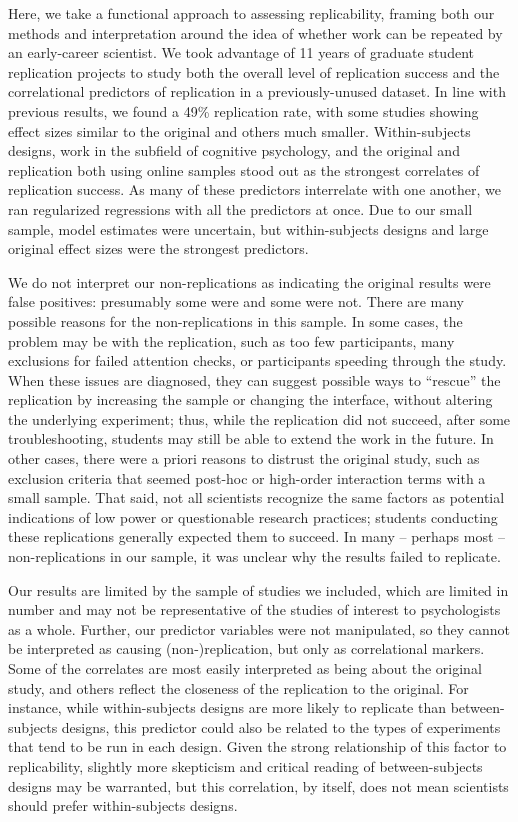 \documentclass[
  english,
  a4paper,
]{article}
\begin{document}
Here, we take a functional approach to assessing replicability, framing both our methods and interpretation around the idea of whether work can be repeated by an early-career scientist. We took advantage of 11 years of graduate student replication projects to study both the overall level of replication success and the correlational predictors of replication in a previously-unused dataset. In line with previous results, we found a 49\% replication rate, with some studies showing effect sizes similar to the original and others much smaller. Within-subjects designs, work in the subfield of cognitive psychology, and the original and replication both using online samples stood out as the strongest correlates of replication success. As many of these predictors interrelate with one another, we ran regularized regressions with all the predictors at once. Due to our small sample, model estimates were uncertain, but within-subjects designs and large original effect sizes were the strongest predictors.

We do not interpret our non-replications as indicating the original results were false positives: presumably some were and some were not. There are many possible reasons for the non-replications in this sample. In some cases, the problem may be with the replication, such as too few participants, many exclusions for failed attention checks, or participants speeding through the study. When these issues are diagnosed, they can suggest possible ways to ``rescue'' the replication by increasing the sample or changing the interface, without altering the underlying experiment; thus, while the replication did not succeed, after some troubleshooting, students may still be able to extend the work in the future. In other cases, there were a priori reasons to distrust the original study, such as exclusion criteria that seemed post-hoc or high-order interaction terms with a small sample. That said, not all scientists recognize the same factors as potential indications of low power or questionable research practices; students conducting these replications generally expected them to succeed. In many -- perhaps most -- non-replications in our sample, it was unclear why the results failed to replicate.

Our results are limited by the sample of studies we included, which are limited in number and may not be representative of the studies of interest to psychologists as a whole. Further, our predictor variables were not manipulated, so they cannot be interpreted as causing (non-)replication, but only as correlational markers. Some of the correlates are most easily interpreted as being about the original study, and others reflect the closeness of the replication to the original. For instance, while within-subjects designs are more likely to replicate than between-subjects designs, this predictor could also be related to the types of experiments that tend to be run in each design. Given the strong relationship of this factor to replicability, slightly more skepticism and critical reading of between-subjects designs may be warranted, but this correlation, by itself, does not mean scientists should prefer within-subjects designs.
\end{document}
